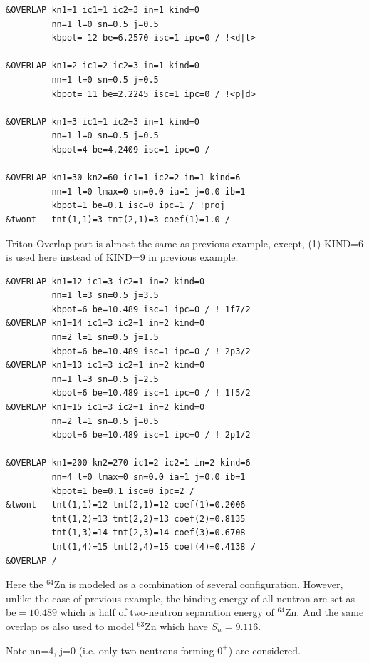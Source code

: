 \documentclass[11pt]{book}
\begin{document}
\begin{small} \begin{lstlisting}[frame=single]
&OVERLAP kn1=1 ic1=1 ic2=3 in=1 kind=0 
         nn=1 l=0 sn=0.5 j=0.5
         kbpot= 12 be=6.2570 isc=1 ipc=0 / !<d|t>

&OVERLAP kn1=2 ic1=2 ic2=3 in=1 kind=0 
         nn=1 l=0 sn=0.5 j=0.5
         kbpot= 11 be=2.2245 isc=1 ipc=0 / !<p|d>

&OVERLAP kn1=3 ic1=1 ic2=3 in=1 kind=0
         nn=1 l=0 sn=0.5 j=0.5
         kbpot=4 be=4.2409 isc=1 ipc=0 /

&OVERLAP kn1=30 kn2=60 ic1=1 ic2=2 in=1 kind=6 
         nn=1 l=0 lmax=0 sn=0.0 ia=1 j=0.0 ib=1
         kbpot=1 be=0.1 isc=0 ipc=1 / !proj
&twont   tnt(1,1)=3 tnt(2,1)=3 coef(1)=1.0 /
\end{lstlisting}\end{small}
Triton Overlap part is almost the same as previous example,
except, (1) KIND=6 is used here instead of KIND=9 in previous example. 

\begin{small} \begin{lstlisting}[frame=single]
&OVERLAP kn1=12 ic1=3 ic2=1 in=2 kind=0 
         nn=1 l=3 sn=0.5 j=3.5 
         kbpot=6 be=10.489 isc=1 ipc=0 / ! 1f7/2
&OVERLAP kn1=14 ic1=3 ic2=1 in=2 kind=0 
         nn=2 l=1 sn=0.5 j=1.5 
         kbpot=6 be=10.489 isc=1 ipc=0 / ! 2p3/2
&OVERLAP kn1=13 ic1=3 ic2=1 in=2 kind=0 
         nn=1 l=3 sn=0.5 j=2.5 
         kbpot=6 be=10.489 isc=1 ipc=0 / ! 1f5/2
&OVERLAP kn1=15 ic1=3 ic2=1 in=2 kind=0 
         nn=2 l=1 sn=0.5 j=0.5 
         kbpot=6 be=10.489 isc=1 ipc=0 / ! 2p1/2

&OVERLAP kn1=200 kn2=270 ic1=2 ic2=1 in=2 kind=6
         nn=4 l=0 lmax=0 sn=0.0 ia=1 j=0.0 ib=1
         kbpot=1 be=0.1 isc=0 ipc=2 /
&twont   tnt(1,1)=12 tnt(2,1)=12 coef(1)=0.2006
         tnt(1,2)=13 tnt(2,2)=13 coef(2)=0.8135
         tnt(1,3)=14 tnt(2,3)=14 coef(3)=0.6708
         tnt(1,4)=15 tnt(2,4)=15 coef(4)=0.4138 /
&OVERLAP /
\end{lstlisting}\end{small}
Here the $^64$Zn is modeled as a combination of several configuration. 
However, unlike the case of previous example, 
the binding energy of all neutron are set as be$=10.489$
which is half of two-neutron separation energy of $^{64}$Zn. 
And the same overlap os also used to model $^{63}$Zn
which have $S_n=9.116$. 

Note nn=4, j=0 (i.e. only two neutrons forming $0^+$) are considered. 
\end{document}
